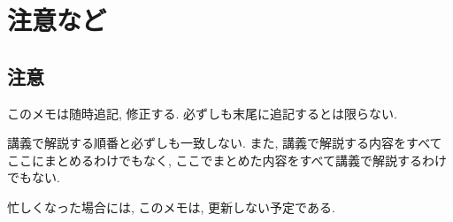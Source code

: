 \chapter{注意など}
\section{注意}
このメモは随時追記, 修正する.
必ずしも末尾に追記するとは限らない.

講義で解説する順番と必ずしも一致しない.
また, 講義で解説する内容をすべてここにまとめるわけでもなく,
ここでまとめた内容をすべて講義で解説するわけでもない.

忙しくなった場合には,
このメモは,
更新しない予定である.


